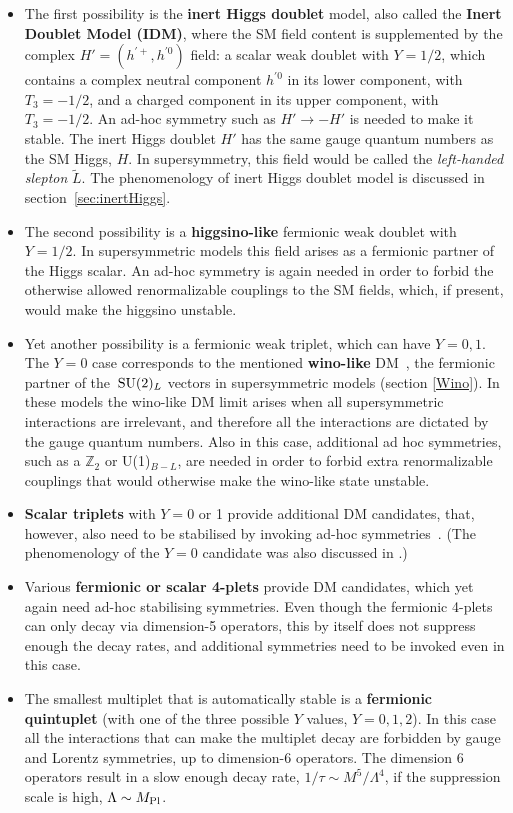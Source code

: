 \begin{itemize}
\item[$2_S$] The first possibility is the  {\bf inert Higgs doublet} model, also called the {\bf Inert Doublet Model (IDM)}, where the SM field content is supplemented by the complex $H' = (h^{\prime +}, h^{\prime 0})$ field: 
a scalar weak doublet with $Y=1/2$,
which contains a complex neutral component $h^{\prime 0}$ in its lower component, with $T_3 = -1/2$,
and a charged component in its upper component, with $T_3=-1/2$.
An ad-hoc symmetry such as $H'\to - H'$ is needed to make  it stable.
The inert Higgs doublet $H'$ has the same gauge quantum numbers as the SM Higgs,  $H$. In supersymmetry, this field would be called the {\em left-handed slepton} $\tilde{L}$. The phenomenology of inert Higgs doublet model
is discussed in section~\ref{sec:inertHiggs}.

 
 \item[$2_F$] The second possibility is a {\bf higgsino-like} fermionic weak doublet with $Y=1/2$. In supersymmetric models this field arises
 as a fermionic partner of the Higgs scalar.  An ad-hoc symmetry is again needed in order to forbid the otherwise allowed
 renormalizable couplings to the SM fields, which, if present, would make the higgsino unstable.
 
 \item[$3_F$]
 Yet another possibility is a fermionic weak triplet, which can have $Y=0, 1$. The $Y=0$ case corresponds to the mentioned {\bf wino-like} DM~\cite{Wino}, the fermionic partner of the $\,{\rm SU}(2)_L$ vectors in supersymmetric models (section \ref{Wino}). In these models the wino-like DM limit arises when 
  all  supersymmetric interactions are irrelevant, and therefore all the interactions are dictated by
 the gauge quantum numbers.
Also in this case, additional ad hoc symmetries,  such as a $\mathbb{Z}_2$ or U(1)$_{B-L}$, 
 are needed in order to forbid extra renormalizable couplings that would otherwise make the wino-like state unstable.
 
 
\item[$3_S$]  {\bf Scalar triplets} with $Y=0$ or 1 provide additional DM candidates, 
that, however, also need to be stabilised by invoking ad-hoc symmetries~\cite{MDM}. (The phenomenology of the $Y=0$ candidate
was also discussed in \cite{Arakawa:2021vih}.)

\item[$4$]  Various {\bf fermionic or scalar 4-plets} provide DM candidates, which yet again need ad-hoc stabilising symmetries.
Even though the fermionic 4-plets can only decay via dimension-5 operators, this by itself does not suppress enough the decay rates, and additional symmetries need to be invoked even in this case.
 
\item[$5_F$] The smallest multiplet that is automatically stable  is a {\bf fermionic quintuplet} (with one of the three possible $Y$ values,  $Y = 0,1,2$).
In this case all the interactions that can make the multiplet decay are 
 forbidden by gauge and Lorentz symmetries, up to dimension-6 operators. The dimension 6 operators result in a slow enough decay rate, 
 $1/\tau \sim M^5/\Lambda^4$,  if the suppression scale is  high, $\Lambda \sim M_{\rm Pl}$. 
 \end{itemize}
